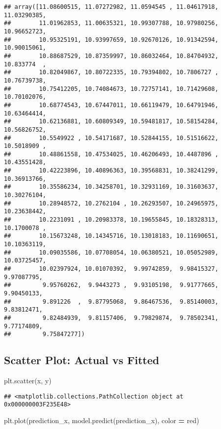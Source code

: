 \documentclass[
]{book}
\newenvironment{Shaded}{\begin{snugshade}}{\end{snugshade}}
\newcommand{\NormalTok}[1]{#1}
\newcommand{\OperatorTok}[1]{\textcolor[rgb]{0.81,0.36,0.00}{\textbf{#1}}}
\newcommand{\StringTok}[1]{\textcolor[rgb]{0.31,0.60,0.02}{#1}}
\begin{document}
\begin{verbatim}
## array([11.08600515, 11.07272982, 11.0594545 , 11.04617918, 11.03290385,
##        11.01962853, 11.00635321, 10.99307788, 10.97980256, 10.96652723,
##        10.95325191, 10.93997659, 10.92670126, 10.91342594, 10.90015061,
##        10.88687529, 10.87359997, 10.86032464, 10.84704932, 10.833774  ,
##        10.82049867, 10.80722335, 10.79394802, 10.7806727 , 10.76739738,
##        10.75412205, 10.74084673, 10.72757141, 10.71429608, 10.70102076,
##        10.68774543, 10.67447011, 10.66119479, 10.64791946, 10.63464414,
##        10.62136881, 10.60809349, 10.59481817, 10.58154284, 10.56826752,
##        10.5549922 , 10.54171687, 10.52844155, 10.51516622, 10.5018909 ,
##        10.48861558, 10.47534025, 10.46206493, 10.4487896 , 10.43551428,
##        10.42223896, 10.40896363, 10.39568831, 10.38241299, 10.36913766,
##        10.35586234, 10.34258701, 10.32931169, 10.31603637, 10.30276104,
##        10.28948572, 10.2762104 , 10.26293507, 10.24965975, 10.23638442,
##        10.2231091 , 10.20983378, 10.19655845, 10.18328313, 10.1700078 ,
##        10.15673248, 10.14345716, 10.13018183, 10.11690651, 10.10363119,
##        10.09035586, 10.07708054, 10.06380521, 10.05052989, 10.03725457,
##        10.02397924, 10.01070392,  9.99742859,  9.98415327,  9.97087795,
##         9.95760262,  9.9443273 ,  9.93105198,  9.91777665,  9.90450133,
##         9.891226  ,  9.87795068,  9.86467536,  9.85140003,  9.83812471,
##         9.82484939,  9.81157406,  9.79829874,  9.78502341,  9.77174809,
##         9.75847277])
\end{verbatim}

\hypertarget{scatter-plot-actual-vs-fitted}{%
\subsection{Scatter Plot: Actual vs Fitted}\label{scatter-plot-actual-vs-fitted}}

\begin{Shaded}
\begin{Highlighting}[]
\NormalTok{plt.scatter(x, y)}
\end{Highlighting}
\end{Shaded}

\begin{verbatim}
## <matplotlib.collections.PathCollection object at 0x000000003F235E48>
\end{verbatim}

\begin{Shaded}
\begin{Highlighting}[]
\NormalTok{plt.plot(prediction\_x, model.predict(prediction\_x), color }\OperatorTok{=} \StringTok{\textquotesingle{}red\textquotesingle{}}\NormalTok{)}
\end{Highlighting}
\end{Shaded}
\end{document}
